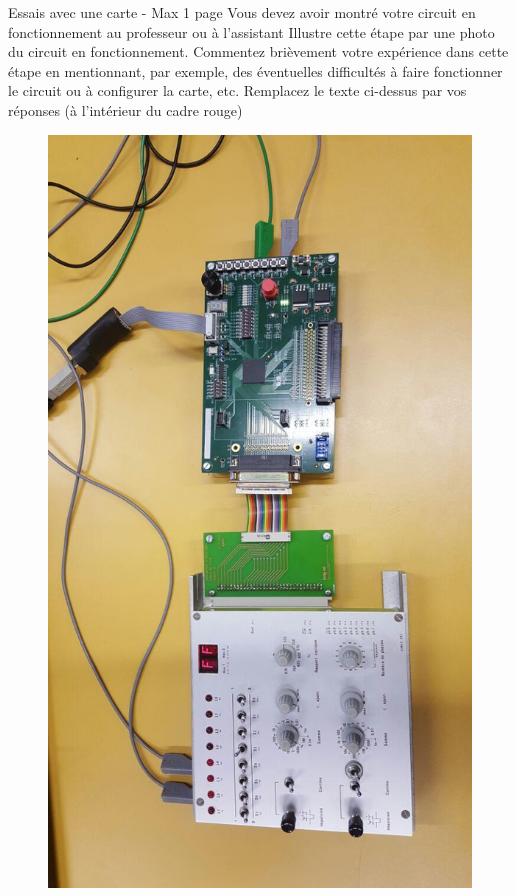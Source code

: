 \documentclass[a4paper]{article}
\begin{document}
\begin{tcolorbox}[colframe=Monokaimagenta,colback=white]
Essais avec une carte - Max 1 page 
Vous devez avoir montré votre circuit en fonctionnement au professeur ou à l’assistant
Illustre cette étape par une photo du circuit en fonctionnement.
Commentez brièvement votre expérience dans cette étape en mentionnant, par exemple, des éventuelles difficultés à faire fonctionner le circuit ou à configurer la carte, etc.
Remplacez le texte ci-dessus par vos réponses (à l’intérieur du cadre rouge)

\begin{figure}[H]
    \centering
    \includegraphics[width=\textwidth]{src/alu_carte.jpg}
    \label{fig:ISZERO}
\end{figure}


\end{tcolorbox}
\end{document}
